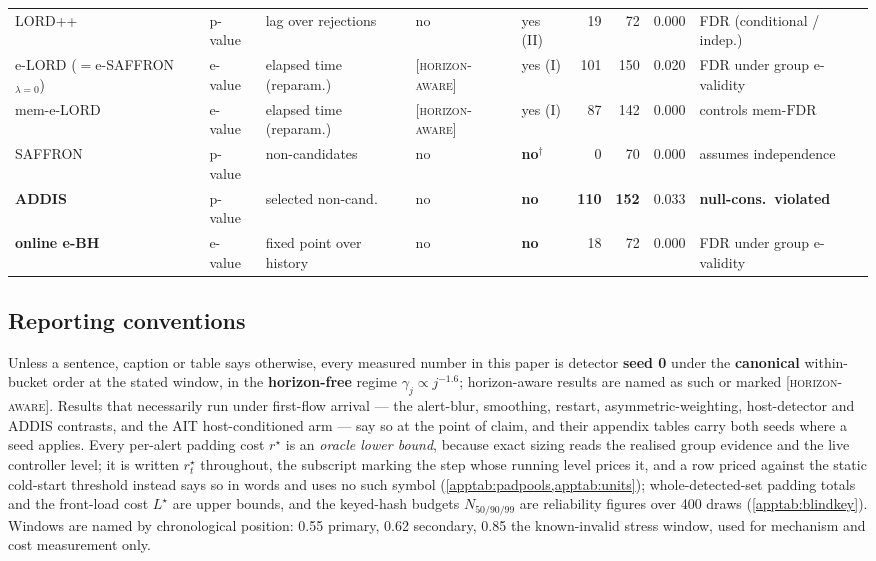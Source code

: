 \documentclass[conference]{IEEEtran}
\newcommand{\FDR}{\mathrm{FDR}}
\newcommand{\oracle}{\textsc{[horizon-aware]}}
\begin{document}
\begin{table}[t]
{\begin{tabular}{lllllrrrl}
LORD++~\cite{ramdas2017lordpp}     & p-value & lag over rejections & no & yes (II) & 19 & 72 & 0.000 & FDR (conditional / indep.) \\
e-LORD ($=$e-SAFFRON$_{\lambda{=}0}$)~\cite{egai2025} & e-value & elapsed time (reparam.) & \oracle & yes (I) & 101 & 150 & 0.020 & FDR under group e-validity \\
mem-e-LORD~\cite{egai2025}         & e-value & elapsed time (reparam.) & \oracle & yes (I) & 87 & 142 & 0.000 & controls mem-$\FDR$ \\
SAFFRON~\cite{ramdas2018saffron}   & p-value & non-candidates & no & \textbf{no}$^\dagger$ & 0 & 70 & 0.000 & assumes independence \\
\textbf{ADDIS}~\cite{tian2019addis}& p-value & selected non-cand.\ & no & \textbf{no} & \textbf{110} & \textbf{152} & 0.033 & \textbf{null-cons.\ violated} \\
\textbf{online e-BH}~\cite{xu2024elond,fischer2025onlineebh} & e-value & fixed point over history & no & \textbf{no} & 18 & 72 & 0.000 & FDR under group e-validity \\
\bottomrule
\end{tabular}}
\end{table}

\subsection{Reporting conventions}\label{app:conventions}

Unless a sentence, caption or table says otherwise, every measured number in this paper is detector
\textbf{seed 0} under the \textbf{canonical} within-bucket order at the stated window, in the
\textbf{horizon-free} regime $\gamma_j\propto j^{-1.6}$; horizon-aware results are named as such or
marked \oracle. Results that
necessarily run under first-flow arrival --- the alert-blur, smoothing, restart, asymmetric-weighting,
host-detector and ADDIS contrasts, and the AIT host-conditioned arm --- say so at the point of claim,
and their appendix tables carry both seeds where a seed applies. Every per-alert padding cost
$r^{\star}$ is an \emph{oracle lower bound}, because exact sizing reads the realised group evidence and
the live controller level; it is written $r^{\star}_t$ throughout, the subscript marking the step whose
running level prices it, and a row priced against the static cold-start threshold instead says so in
words and uses no such symbol (\cref{apptab:padpools,apptab:units}); whole-detected-set padding totals and the front-load cost $L^{\star}$ are
upper bounds, and the keyed-hash budgets $N_{50/90/99}$ are reliability figures over 400 draws
(\cref{apptab:blindkey}). Windows are named by chronological position: 0.55 primary, 0.62 secondary, 0.85 the
known-invalid stress window, used for mechanism and cost measurement only.
\end{document}
